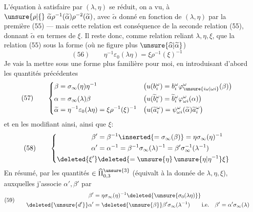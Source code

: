 L'équation à satisfaire par $(\lambda,\eta)$ se réduit, on a vu, à $\unsure{\rho|\{}\ \widetilde\alpha\rho^{-1}(\widetilde\alpha)\rho^{-2}(\widetilde\alpha)$, avec $\widetilde\alpha$ donné en fonction de $(\lambda,\eta)$ par la première   (55) --- mais cette relation  est conséquence de la seconde relation (55), donnant $\widetilde\alpha$ en termes de $\xi$. Il reste donc, comme relation reliant $\lambda,\eta,\xi$, que la relation (55) sous la forme (où ne figure plus $\unsure{\widehat\alpha|\widetilde\alpha}$)
\[
(56)\qquad\eta^{-1}\varepsilon_0(\lambda\eta)=\xi\rho^{-1}(\xi)^{-1}
\]
Je vais la mettre sous une forme plus familière pour moi, en introduisant d'abord les quantités précédentes
\[
(57)\qquad\left\{\begin{aligned}
\beta&=\sigma_\infty(\eta)\eta^{-1}
&&\bigl(u(b_i^\omega)=b_i^\omega\varphi_{\unsure{i\omega|\omega i}}^\omega(\beta)\bigr)\\
\alpha&=\sigma_\infty(\lambda)\beta
&&\bigl(u(\widetilde b_i^\omega)=\widetilde b_i^\omega\varphi_{\omega i}^\omega(\alpha)\bigr)\\
\widetilde\alpha&=\eta^{-1}\varepsilon_0(\lambda\eta)=\xi\rho^{-1}(\xi)^{-1}
&&\bigl(u(\widetilde a_i^\omega)=\psi_{\omega i}^\omega(\widetilde\alpha)\widetilde a_i^\omega\bigr)
\end{aligned}\right.
\]
et en les modifiant ainsi, ainsi que $\xi$:
\[
(58)\qquad\left\{\begin{aligned}
\beta'&=\beta^{-1}\inserted{=\sigma_\infty(\beta)}=\eta\sigma_\infty(\eta)^{-1}\\
\alpha'&=\alpha^{-1}=\beta^{-1}\sigma_\infty(\lambda)^{-1}=\beta'\sigma_\infty^{-1}(\lambda^{-1})\\
\deleted{\xi'}&\deleted{=\unsure{\eta}\,\unsure{\eta|\eta^{-1}}\xi}
\end{aligned}\right.
\]
En résumé,  par les quantités  $\in\widehat\Pi_{0,3}^{\unsure{3}}$ (équivalt à la donnée de $\lambda,\eta,\xi$), auxquelles j'associe $\alpha',\beta'$ par
\[
(59)\qquad\begin{aligned}
\beta'&=\eta\sigma_\infty(\eta)^{-1}\deleted{\unsure{\sigma_0(\lambda\eta)}}\\
\deleted{\unsure{d'}}\alpha'&=\deleted{\unsure{\beta}}\beta'\sigma_\infty(\lambda^{-1})
\qquad\text{i.e.}\quad\beta'=\alpha'\sigma_\infty(\lambda)
\end{aligned}
\]

